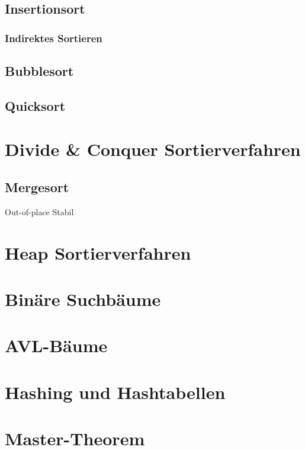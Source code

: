 \documentclass[12pt,a4paper]{article}
\begin{document}
\subsection{Insertionsort}

\subsubsection{Indirektes Sortieren}

\subsection{Bubblesort}

\subsection{Quicksort}

\section{Divide \& Conquer Sortierverfahren}

\subsection{Mergesort}
Out-of-place\newline
Stabil\newline

\section{Heap Sortierverfahren}

\section{Binäre Suchbäume}

\section{AVL-Bäume}

\section{Hashing und Hashtabellen}

\section{Master-Theorem}
\end{document}

